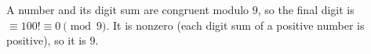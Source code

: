 A number and its digit sum are congruent modulo $9$, so the final digit is $\equiv100!\equiv0\pmod9$. It is nonzero (each digit sum of a positive number is positive), so it is $\boxed{9}$.
